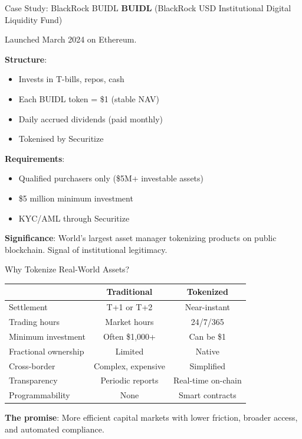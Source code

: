 \documentclass[10pt]{beamer}
\begin{document}
\begin{frame}{Case Study: BlackRock BUIDL}
  \textbf{BUIDL} (BlackRock USD Institutional Digital Liquidity Fund)
  
  \vspace{0.5em}
  Launched March 2024 on Ethereum.
  
  \vspace{1em}
  \textbf{Structure}:
  \begin{itemize}
    \item Invests in T-bills, repos, cash
    \item Each BUIDL token = \$1 (stable NAV)
    \item Daily accrued dividends (paid monthly)
    \item Tokenised by Securitize
  \end{itemize}
  
  \vspace{0.5em}
  \textbf{Requirements}:
  \begin{itemize}
    \item Qualified purchasers only (\$5M+ investable assets)
    \item \$5 million minimum investment
    \item KYC/AML through Securitize
  \end{itemize}
  
  \vspace{0.5em}
  \textbf{Significance}: World's largest asset manager tokenizing products on public blockchain. Signal of institutional legitimacy.
\end{frame}

\begin{frame}{Why Tokenize Real-World Assets?}
  
  \begin{center}
  \begin{tabular}{lcc}
    \toprule
    & \textbf{Traditional} & \textbf{Tokenized} \\
    \midrule
    Settlement & T+1 or T+2 & Near-instant \\
    Trading hours & Market hours & 24/7/365 \\
    Minimum investment & Often \$1,000+ & Can be \$1 \\
    Fractional ownership & Limited & Native \\
    Cross-border & Complex, expensive & Simplified \\
    Transparency & Periodic reports & Real-time on-chain \\
    Programmability & None & Smart contracts \\
    \bottomrule
  \end{tabular}
  \end{center}
  
  \vspace{0.5em}
  \textbf{The promise}: More efficient capital markets with lower friction, broader access, and automated compliance.
\end{frame}
\end{document}
